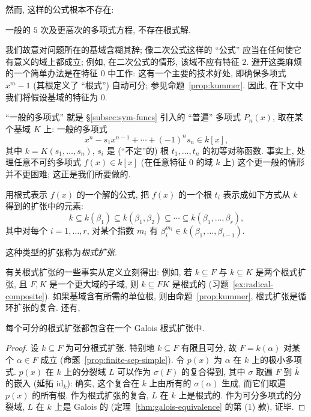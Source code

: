 然而, 这样的公式根本不存在:

\begin{theorem}\label{thm:no-radical-solution}
一般的 $5$ 次及更高次的多项式方程, 不存在根式解.
\end{theorem}

我们故意对问题所在的基域含糊其辞; 像二次公式这样的 ``公式'' 应当在任何使它有意义的域上都成立; 例如, 在二次公式的情形, 该域不应有特征 $2$. 避开这类麻烦的一个简单办法是在特征 $0$ 中工作: 这有一个主要的技术好处, 即确保多项式 $x^m-1$ (其根定义了 ``根式'') 自动可分; 参见命题~\ref{prop:kummer}. 因此, 在下文中我们将假设基域的特征为 $0$.

``一般的多项式'' 就是 §\ref{subsec:sym-funcs} 引入的 ``普遍'' 多项式 $P_n(x)$, 取在某个基域 $K$ 上: 一般的多项式
\[
x^n-s_1x^{n-1}+\cdots+(-1)^n s_n\in k[x],
\]
其中 $k=K(s_1,\ldots,s_n)$, $s_i$ 是 (``不定''的) 根 $t_1,\ldots,t_n$ 的初等对称函数. 事实上, 处理任意不可约多项式 $f(x)\in k[x]$ (在任意特征 $0$ 的域 $k$ 上) 这个更一般的情形并不更困难; 这正是我们所要做的.

用根式表示 $f(x)$ 的一个解的公式, 把 $f(x)$ 的一个根 $t_i$ 表示成如下方式从 $k$ 得到的扩张中的元素:
\[
k\subseteq k(\beta_1)\subseteq k(\beta_1,\beta_2)\subseteq\cdots\subseteq k(\beta_1,\ldots,\beta_r),
\]
其中对每个 $i=1,\ldots,r$, 对某个指数 $m_i$ 有 $\beta_i^{m_i}\in k(\beta_1,\ldots,\beta_{i-1})$.

\begin{definition}\label{def:radical-extension}
这种类型的扩张称为\emph{根式扩张}.
\end{definition}

有关根式扩张的一些事实从定义立刻得出: 例如, 若 $k\subseteq F$ 与 $k\subseteq K$ 是两个根式扩张, 且 $F,K$ 是一个更大域的子域, 则 $k\subseteq FK$ 是根式的 (习题~\ref{ex:radical-composite}). 如果基域含有所需的单位根, 则由命题~\ref{prop:kummer}, 根式扩张是循环扩张的复合. 还有,

\begin{lemma}\label{lem:sep-radical-in-galois}
每个可分的根式扩张都包含在一个 Galois 根式扩张中.
\end{lemma}

\begin{proof}
设 $k\subseteq F$ 为可分根式扩张. 特别地 $k\subseteq F$ 有限且可分, 故 $F=k(\alpha)$ 对某个 $\alpha\in F$ 成立 (命题~\ref{prop:finite-sep-simple}). 令 $p(x)$ 为 $\alpha$ 在 $k$ 上的极小多项式. $p(x)$ 在 $k$ 上的分裂域 $L$ 可以作为 $\sigma(F)$ 的复合得到, 其中 $\sigma$ 取遍 $F$ 到 $\overline{k}$ 的嵌入 (延拓 $\mathrm{id}_k$): 确实, 这个复合在 $k$ 上由所有的 $\sigma(\alpha)$ 生成, 而它们取遍 $p(x)$ 的所有根. 作为根式扩张的复合, $L$ 在 $k$ 上是根式的. 作为可分多项式的分裂域, $L$ 在 $k$ 上是 Galois 的 (定理~\ref{thm:galois-equivalence} 的第 (1) 款), 证毕.
\end{proof}

